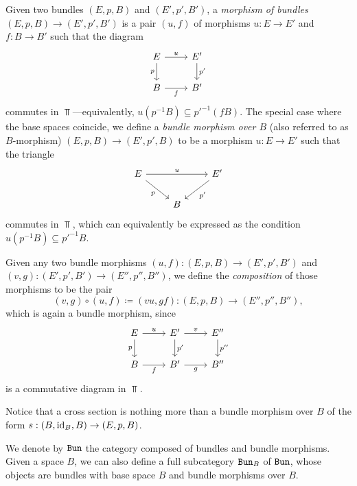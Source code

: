 \documentclass[../../../deep-dive]{subfile}
\begin{document}
\begin{definition}
\label{def:bundle-morphism}
Given two bundles \((E, p, B)\) and \((E', p', B')\), a \emph{morphism of
  bundles} \((E, p, B) \to (E', p', B')\) is a pair \((u, f)\) of morphisms
\(u: E \to E'\) and \(f: B \to B'\) such that the diagram
\[
\begin{tikzcd}
E \ar[r, "u"] \ar[d, "p"'] &E' \ar[d, "p'"] \\
B \ar[r, "f"'] &B'
\end{tikzcd}
\]
commutes in \(\Top\)---equivalently, \(u (p^{-1} B) \subseteq p'^{-1}(f
B)\). The special case where the base spaces coincide, we define a \emph{bundle
  morphism over \(B\)} (also referred to as \(B\)-morphism)
\((E, p, B) \to (E', p', B)\) to be a morphism \(u: E \to E'\) such that the
triangle
\[
\begin{tikzcd}
E \ar[rr, "u"] \ar[dr, "p"'] & &E' \ar[ld, "p'"] \\
&B &
\end{tikzcd}
\]
commutes in \(\Top\), which can equivalently be expressed as the condition
\(u (p^{-1} B) \subseteq p'^{-1} B\).

Given any two bundle morphisms \((u, f): (E, p, B) \to (E', p', B')\) and \((v,
g): (E', p', B') \to (E'', p'', B'')\), we define the \emph{composition} of
those morphisms to be the pair
\[
(v, g) \circ (u, f) \coloneq (v u, g f):
(E, p, B) \longrightarrow (E'', p'', B''),
\]
which is again a bundle morphism, since
\[
\begin{tikzcd}
E \ar[r, "u"] \ar[d, "p"']
&E' \ar[d, "p'"] \ar[r, "v"]
&E'' \ar[d, "p''"]
\\
B \ar[r, "f"']
&B' \ar[r, "g"']
&B''
\end{tikzcd}
\]
is a commutative diagram in \(\Top\).
\end{definition}

\begin{example}
\label{exp:cross-section-is-bundle-morphism}
Notice that a cross section is nothing more than a bundle morphism over \(B\) of
the form \(s: (B, \operatorname{id}_B, B) \to (E, p, B)\).
\end{example}

\begin{definition}
\label{def:category-of-bundles}
We denote by \({\texttt{Bun}}\) the category composed of bundles and bundle
morphisms. Given a space \(B\), we can also define a full subcategory \({\texttt{Bun}}_B\)
of \({\texttt{Bun}}\), whose objects are bundles with base space \(B\) and bundle
morphisms over \(B\).
\end{definition}
\end{document}
